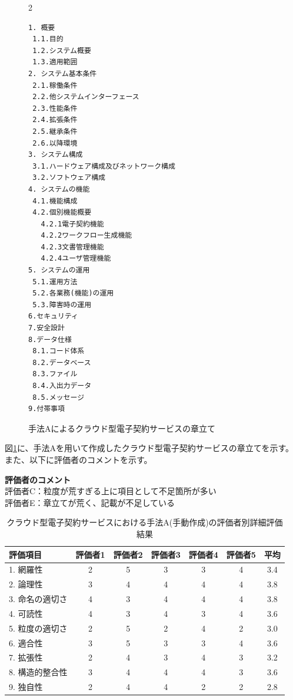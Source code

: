 \begin{figure}[tp]
\begin{tcolorbox}[
  colback=white,
  colframe=orange,
  fonttitle=\bfseries
]
\begin{multicols}{2}
\footnotesize
\ttfamily
\fontsize{8}{9}\selectfont
\begin{verbatim}
1. 概要
 1.1.目的
 1.2.システム概要
 1.3.適用範囲
2. システム基本条件
 2.1.稼働条件
 2.2.他システムインターフェース
 2.3.性能条件
 2.4.拡張条件
 2.5.継承条件
 2.6.以降環境
3. システム構成
 3.1.ハードウェア構成及びネットワーク構成
 3.2.ソフトウェア構成
4. システムの機能
 4.1.機能構成
 4.2.個別機能概要
   4.2.1電子契約機能
   4.2.2ワークフロー生成機能
   4.2.3文書管理機能
   4.2.4ユーザ管理機能
5. システムの運用
 5.1.運用方法
 5.2.各業務(機能)の運用
 5.3.障害時の運用
6.セキュリティ
7.安全設計
8.データ仕様
 8.1.コード体系
 8.2.データベース
 8.3.ファイル
 8.4.入出力データ
 8.5.メッセージ
9.付帯事項
\end{verbatim}
\end{multicols}
\end{tcolorbox}
\caption{手法Aによるクラウド型電子契約サービスの章立て}
\label{fig:A_chapter_structure_of_cloud_contract_system}
\end{figure}


図\ref{fig:A_chapter_structure_of_cloud_contract_system}に、手法Aを用いて作成したクラウド型電子契約サービスの章立てを示す。
また、以下に評価者のコメントを示す。

\noindent\textbf{評価者のコメント}\\
評価者C：粒度が荒すぎる上に項目として不足箇所が多い\\
評価者E：章立てが荒く、記載が不足している\\

\begin{table}[tp]
  \caption{クラウド型電子契約サービスにおける手法A(手動作成)の評価者別詳細評価結果}
  \label{tb:cloud_detailed_evaluation_results_A}
  \centering
  \begin{tabular}{|l|c|c|c|c|c|c|}
    \hline
    \textbf{評価項目} & \textbf{評価者1} & \textbf{評価者2} & \textbf{評価者3} & \textbf{評価者4} & \textbf{評価者5} & \textbf{平均} \\
    \hline\hline
    1. 網羅性 & 2 & 5 & 3 & 3 & 4 & 3.4 \\
    \hline
    2. 論理性 & 3 & 4 & 4 & 4 & 4 & 3.8 \\
    \hline
    3. 命名の適切さ & 4 & 3 & 4 & 4 & 4 & 3.8 \\
    \hline
    4. 可読性 & 4 & 3 & 4 & 3 & 4 & 3.6 \\
    \hline
    5. 粒度の適切さ & 2 & 5 & 2 & 4 & 2 & 3.0 \\
    \hline
    6. 適合性 & 3 & 5 & 3 & 3 & 4 & 3.6 \\
    \hline
    7. 拡張性 & 2 & 4 & 3 & 4 & 3 & 3.2 \\
    \hline
    8. 構造的整合性 & 3 & 4 & 4 & 4 & 3 & 3.6 \\
    \hline
    9. 独自性 & 2 & 4 & 4 & 2 & 2 & 2.8 \\
    \hline
  \end{tabular}
\end{table}

